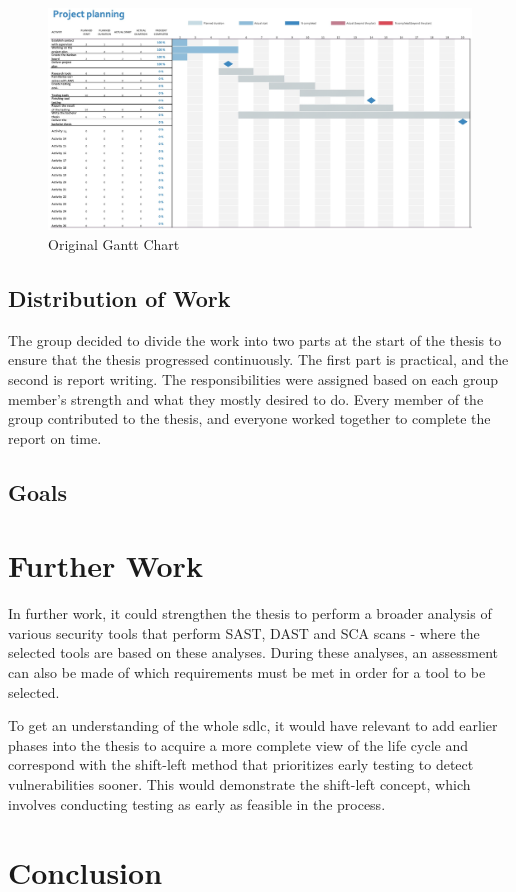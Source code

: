 \vspace{2mm}
\begin{figure}[H]
    \centering
    \includegraphics[width=0.8\columnwidth]{Images/gantt2.jpg}
    \caption{Original Gantt Chart}
    \label{fig: Original Gantt Chart}
\end{figure}


\subsection{Distribution of Work}
The group decided to divide the work into two parts at the start of the thesis to ensure that the thesis progressed continuously. The first part is practical, and the second is report writing. The responsibilities were assigned based on each group member's strength and what they mostly desired to do. Every member of the group contributed to the thesis, and everyone worked together to complete the report on time. 


\subsection{Goals}



\section{Further Work}

In further work, it could strengthen the thesis to perform a broader analysis of various security tools that perform SAST, DAST and SCA scans -  where the selected tools are based on these analyses. During these analyses, an assessment can also be made of which requirements must be met in order for a tool to be selected. 

To get an understanding of the whole \acrlong{sdlc}, it would have relevant to add earlier phases into the thesis to acquire a more complete view of the life cycle and correspond with the shift-left method that prioritizes early testing to detect vulnerabilities sooner. This would demonstrate the shift-left concept, which involves conducting testing as early as feasible in the process.  

\section{Conclusion}
